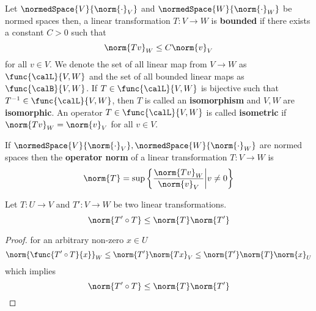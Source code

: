 \begin{definition}
    Let \(\normedSpace{V}{\norm{\cdot}_V}\) and \(\normedSpace{W}{\norm{\cdot}_W}\) be normed spaces then, a linear transformation \(T : V \to W\) is \textbf{bounded} if there exists a constant \(C > 0\) such that
    \begin{equation*}
        \norm{Tv}_W \leq C \norm{v}_V
    \end{equation*}
    for all \(v \in V\). We denote the set of all linear map from \(V \to W\) as \(\func{\calL}{V,W}\) and the set of all bounded linear maps as \(\func{\calB}{V,W}\). If \(T \in \func{\calL}{V,W}\) is bijective such that \(T^{-1} \in \func{\calL}{V,W}\), then \(T\) is called an \textbf{isomorphism} and \(V,W\) are \textbf{isomorphic}. An operator \(T \in \func{\calL}{V,W}\) is called \textbf{isometric} if \(\norm{Tv}_W = \norm{v}_V\) for all \(v \in V\).
\end{definition}

\begin{definition}
    If \(\normedSpace{V}{\norm{\cdot}_V},\normedSpace{W}{\norm{\cdot}_W}\) are normed spaces then the \textbf{operator norm} of a linear transformation \(T : V \to W\) is
    \begin{equation*}
        \norm{T} = \sup \left\{\dfrac{\norm{Tv}_W}{\norm{v}_V} \middle| v \neq 0 \right\}
    \end{equation*}
\end{definition}

\begin{proposition}
    Let \(T : U \to V\) and \(T' : V \to W\) be two linear transformations.
    \begin{equation*}
        \norm{T' \circ T} \leq \norm{T} \norm{T'}
    \end{equation*}
\end{proposition}

\begin{proof}
    for an arbitrary non-zero \(x \in U\)
    \begin{equation*}
        \norm{\func{T' \circ T}{x}}_W \leq \norm{T'} \norm{Tx}_V \leq \norm{T'} \norm{T} \norm{x}_U
    \end{equation*}
    which implies
    \begin{equation*}
        \norm{T' \circ T} \leq \norm{T} \norm{T'}
    \end{equation*}
\end{proof}

